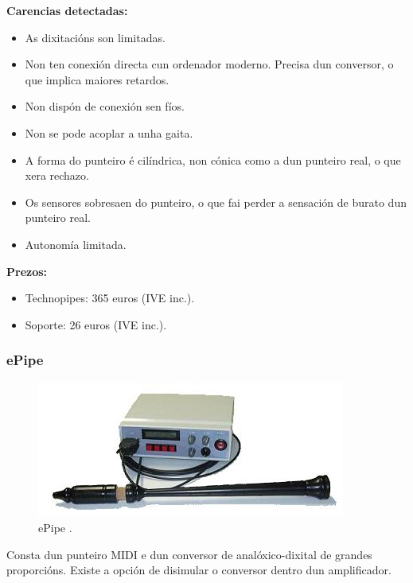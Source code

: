   \textbf{Carencias detectadas:}

  \begin{itemize}
   \item As dixitacións son limitadas.
   \item Non ten conexión directa cun ordenador moderno. Precisa dun conversor,
         o que implica maiores retardos.
   \item Non dispón de conexión sen fíos.
   \item Non se pode acoplar a unha gaita.
   \item A forma do punteiro é cilíndrica, non cónica como a dun punteiro real,
         o que xera rechazo.
   \item Os sensores sobresaen do punteiro, o que fai perder a sensación de
         burato dun punteiro real.
   \item Autonomía limitada.
  \end{itemize}

  \textbf{Prezos:}

  \begin{itemize}
   \item Technopipes: 365 euros (IVE inc.).
   \item Soporte: 26 euros (IVE inc.).
  \end{itemize}

  \subsubsection{ePipe}

  \begin{figure}[htbp]
   \centering
   \includegraphics[scale=0.9,keepaspectratio=true]{./imagenes/epipe.jpg}
   \caption[ePipe]{ePipe \cite{ePipe}.}
   \label{figura:ePipe}
  \end{figure}

  Consta dun punteiro MIDI e dun conversor de analóxico-dixital de grandes
  proporcións. Existe a opción de disimular o conversor dentro dun
  amplificador. \\

